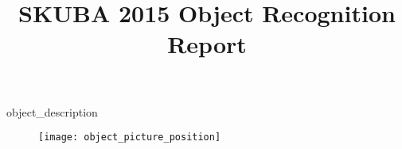 \documentclass[10pt,a4paper]{llncs}
\begin{document}
\title{SKUBA 2015 Object Recognition Report}
\author{ }
\institute{ }
\maketitle

object_description
\begin{figure}
\centering
\texttt{[image: object\_picture\_position]}
\label{fig:base}
\end{figure}
\end{document}
